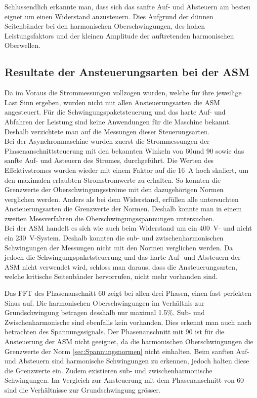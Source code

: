 Schlussendlich erkannte man, dass sich das sanfte Auf- und Absteuern am besten eignet um einen Widerstand anzusteuern. Dies Aufgrund der dünnen Seitenbänder bei den harmonischen Oberschwingungen, des hohen Leistungsfaktors und der kleinen Amplitude der auftretenden harmonischen Oberwellen. 

\subsection{Resultate der Ansteuerungsarten bei der ASM}
Da im Voraus die Strommessungen vollzogen wurden, welche für ihre jeweilige Last Sinn ergeben, wurden nicht mit allen Ansteuerungsarten die ASM angesteuert. Für die Schwingungspaketsteuerung und das harte Auf- und Abfahren der Leistung sind keine Anwendungen für die Maschine bekannt. Deshalb verzichtete man auf die Messungen dieser Steuerungsarten.\\


Bei der Asynchronmaschine wurden zuerst die Strommessungen der Phasenanschnittsteuerung mit den bekannten Winkeln von 60\textdegree und 90\textdegree \hspace{0.02cm} sowie das sanfte Auf- und Asteuern des Stromes, durchgeführt. Die Werten des Effektivstromes wurden wieder mit einem Faktor auf die \SI{16}{A} hoch skaliert, um den maximalen erlaubten Stromstromwerte zu erhalten. So konnten die Grenzwerte der Oberschwingungsströme mit den dazugehörigen Normen verglichen werden. Anders als bei dem Widerstand, erfüllen alle untersuchten Ansteuerungsarten die Grenzwerte der Normen. Deshalb konnte man in einem zweiten Messverfahren die Oberschwingungsspannungen untersuchen.\\

Bei der ASM handelt es sich wie auch beim Widerstand um ein \SI{400}{V}- und nicht ein \SI{230}{V}-System. Deshalb konnten die sub- und zwischenharmonischen Schwingungen der Messungen nicht mit den Normen verglichen werden.
Da jedoch die Schwingungspaketsteuerung und das harte Auf- und Absteuern der ASM nicht verwendet wird, schloss man daraus, dass die Ansteuerungsarten, welche kritische Seitenbänder hervorrufen, nicht mehr vorhanden sind. 

Das FFT des Phasenanschnitt 60\textdegree \hspace{0.02cm} zeigt bei allen drei Phasen, einen fast perfekten Sinus auf.
Die harmonischen Oberschwingungen im Verhältnis zur Grundschwingung betragen desshalb nur maximal 1.5\%. Sub- und Zwischenharmonische sind ebenfalls kein vorhanden. Dies erkennt man auch nach betrachten des Spannungssignals.
Der Phasenanschnitt mit 90\textdegree \hspace{0.02cm} ist für die Ansteuerung der ASM nicht geeignet, da die harmonischen Oberschwingungen die Grenzwerte der Norm \ref{sec:Spannungsnormen} nicht einhalten. 
Beim sanften Auf- und Absteuern sind harmonische Schwingungen zu erkennen, jedoch halten diese die Grenzwerte ein. Zudem existieren sub- und zwischenharmonische Schwingungen. Im Vergleich zur Ansteuerung mit dem Phasenanschnitt von 60\textdegree \hspace{0.02cm} sind die Verhältnisse zur Grundschwingung grösser.\\ 

